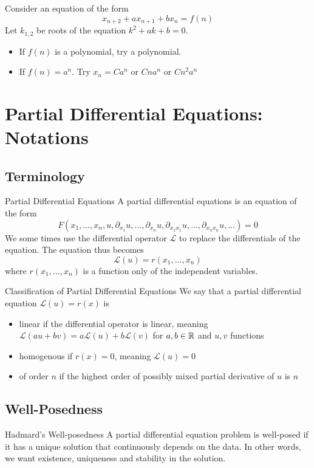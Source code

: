 \documentclass[a4paper]{article}
\begin{document}
\begin{thm}{}{} Consider an equation of the form $$x_{n+2}+ax_{n+1}+bx_n=f(n)$$ Let $k_{1,2}$ be roots of the equation $k^2+ak+b=0$. 
\begin{itemize}
\item If $f(n)$ is a polynomial, try a polynomial. 
\item If $f(n)=a^n$. Try $x_n=Ca^n$ or $Cna^n$ or $Cn^2a^n$
\end{itemize}
\end{thm}

\pagebreak
\section{Partial Differential Equations: Notations}
\subsection{Terminology}
\begin{defn}{Partial Differential Equations}{} A partial differential equations is an equation of the form $$F(x_1,\dots,x_n,u,\partial_{x_1}u,\dots,\partial_{x_n}u,\partial_{x_1x_1}u,\dots,\partial_{x_nx_n}u,\dots)=0$$ We some times use the differential operator $\mathcal{L}$ to replace the differentials of the equation. The equation thus becomes $$\mathcal{L}(u)=r(x_1,\dots,x_n)$$ where $r(x_1,\dots,x_n)$ is a function only of the independent variables. 
\end{defn}

\begin{defn}{Classification of Partial Differential Equations}{} We say that a partial differential equation $\mathcal{L}(u)=r(x)$ is 
\begin{itemize}
\item linear if the differential operator is linear, meaning $\mathcal{L}(au+bv)=a\mathcal{L}(u)+b\mathcal{L}(v)$ for $a,b\in\mathbb{R}$ and $u,v$ functions
\item homogenous if $r(x)=0$, meaning $\mathcal{L}(u)=0$
\item of order $n$ if the highest order of possibly mixed partial derivative of $u$ is $n$
\end{itemize}
\end{defn}

\subsection{Well-Posedness}
\begin{defn}{Hadmard's Well-posedness}{} A partial differential equation problem is well-posed if it has a unique solution that continuously depends on the data. In other words, we want existence, uniqueness and stability in the solution. 
\end{defn}
\end{document}
